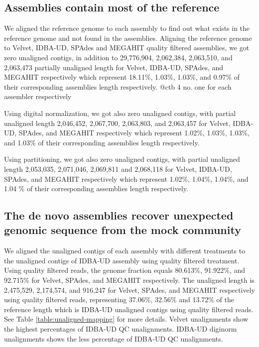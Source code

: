 \subsection*{Assemblies contain most of the reference} 
We aligned the reference genome to each assembly to find out what exists in the reference genome and not found in the assemblies. 
Aligning the reference genome to Velvet, IDBA-UD, SPAdes and MEGAHIT quality filtered assemblies, we got zero unaligned contigs, in addition to 29,776,904, 2,062,384, 2,063,510, and 2,063,473 partially unaligned length for Velvet, IDBA-UD, SPAdes, and MEGAHIT respectively which represent 18.11\%, 1.03\%, 1.03\%, and 0.97\% of their corresponding assemblies length respectively. 
@ctb 4 no. one for each assembler respectively


Using digital normalization, we got also zero unaligned contigs, with partial unaligned length 2,046,452, 2,067,700, 2,063,803, and 2,063,457 for Velvet, IDBA-UD, SPAdes, and MEGAHIT respectively which represent 1.02\%, 1.03\%, 1.03\%, and 1.03\% of their corresponding assemblies length respectively.


Using partitioning, we got also zero unaligned contigs, with partial unaligned length 2,053,035, 2,071,046, 2,069,811 and 2,068,118 for Velvet, IDBA-UD, SPAdes, and MEGAHIT respectively which represent 1.02\%, 1.04\%, 1.04\%, and 1.04 \% of their corresponding assemblies length respectively. 



\subsection*{The de novo assemblies recover unexpected genomic sequence from the mock community}

We aligned the unaligned contigs of each assembly with different treatments to the unaligned contigs of IDBA-UD assembly using quality filtered treatment. 
Using quality filtered reads, the genome fraction equals 80.613\%, 91.922\%, and 92.715\% for Velvet, SPAdes, and MEGAHIT respectively.  The unaligned length is 2,475,529, 2,174,574, and  916,247  for Velvet, SPAdes, and MEGAHIT respectively using quality filtered reads, representing 37.06\%, 32.56\% and 13.72\% of the reference length which is IDBA-UD unaligned contigs using quality filtered reads. See Table \ref{table:unaligned-mapping} for more details.  Velvet unalignments show the highest percentages of IDBA-UD QC unalignments. IDBA-UD diginorm unalignments shows the less percentage of IDBA-UD QC unalignments. 

